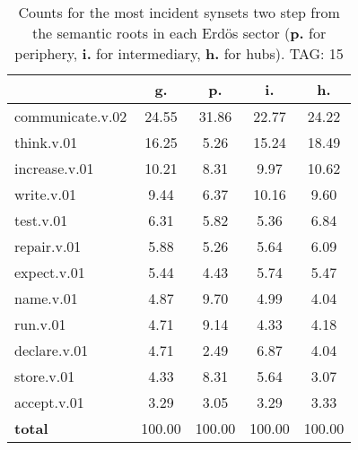 \begin{table}[h!]
\begin{center}
\begin{tabular}{| l | c | c | c | c |}\hline
 & g. & p. & i. & h. \\\hline
communicate.v.02 & 24.55  & 31.86  & 22.77  & 24.22 \\\hline
think.v.01 & 16.25  & 5.26  & 15.24  & 18.49 \\\hline
increase.v.01 & 10.21  & 8.31  & 9.97  & 10.62 \\\hline
write.v.01 & 9.44  & 6.37  & 10.16  & 9.60 \\\hline
test.v.01 & 6.31  & 5.82  & 5.36  & 6.84 \\\hline
repair.v.01 & 5.88  & 5.26  & 5.64  & 6.09 \\\hline
expect.v.01 & 5.44  & 4.43  & 5.74  & 5.47 \\\hline
name.v.01 & 4.87  & 9.70  & 4.99  & 4.04 \\\hline
run.v.01 & 4.71  & 9.14  & 4.33  & 4.18 \\\hline
declare.v.01 & 4.71  & 2.49  & 6.87  & 4.04 \\\hline
store.v.01 & 4.33  & 8.31  & 5.64  & 3.07 \\\hline
accept.v.01 & 3.29  & 3.05  & 3.29  & 3.33 \\\hline
{{\bf total}} & 100.00  & 100.00  & 100.00  & 100.00 \\\hline
\end{tabular}
\caption{Counts for the most incident synsets two step from the semantic roots in each Erd\"os sector ({\bf p.} for periphery, {\bf i.} for intermediary, {\bf h.} for hubs). TAG: 15}
\end{center}
\end{table}
